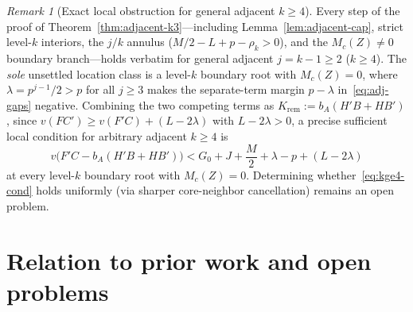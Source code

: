 \documentclass[11pt,reqno]{amsart}
\numberwithin{equation}{section}
\theoremstyle{definition}
\theoremstyle{remark}
\newtheorem{remark}[theorem]{Remark}
\begin{document}
\begin{remark}[Exact local obstruction for general adjacent $k\ge 4$]
\label{rem:adj-kge4}
Every step of the proof of Theorem~\ref{thm:adjacent-k3}---including Lemma~\ref{lem:adjacent-cap}, strict level-$k$ interiors, the $j/k$ annulus ($M/2-L+p-\rho_k > 0$), and the $M_c(Z)\ne 0$ boundary branch---holds verbatim for general adjacent $j=k-1\ge 2$ ($k\ge 4$). The \emph{sole} unsettled location class is a level-$k$ boundary root with $M_c(Z)=0$, where $\lambda = p^{j-1}/2 > p$ for all $j\ge 3$ makes the separate-term margin $p-\lambda$ in~\eqref{eq:adj-gaps} negative. Combining the two competing terms as $K_{\mathrm{rem}} := b_A(H'B + HB')$, since $v(FC') \ge v(F'C) + (L - 2\lambda)$ with $L-2\lambda > 0$, a precise sufficient local condition for arbitrary adjacent $k\ge 4$ is
\begin{equation}
\label{eq:kge4-cond}
v\bigl(F'C - b_A(H'B + HB')\bigr) < G_0 + J + \frac{M}{2} + \lambda - p + (L - 2\lambda)
\end{equation}
at every level-$k$ boundary root with $M_c(Z)=0$. Determining whether~\eqref{eq:kge4-cond} holds uniformly (via sharper core-neighbor cancellation) remains an open problem.
\end{remark}

\section{Relation to prior work and open problems}
\label{sec:prior}
\end{document}
